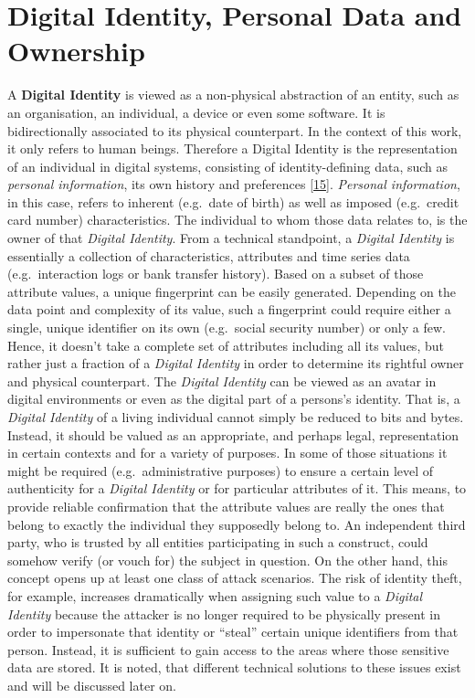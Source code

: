 \documentclass[12pt,english,a4paper,titlepage,cleardoublepage=empty,dottedtoc]{report}
\begin{document}
\hypertarget{digital-identity-personal-data-and-ownership}{\section{Digital
Identity, Personal Data and
Ownership}\label{digital-identity-personal-data-and-ownership}}

A \textbf{\protect\hypertarget{def--digital-identity}{}{Digital
Identity}} is viewed as a non-physical abstraction of an entity, such as
an organisation, an individual, a device or even some software. It is
bidirectionally associated to its physical counterpart. In the context
of this work, it only refers to human beings. Therefore a Digital
Identity is the representation of an individual in digital systems,
consisting of identity-defining data, such as \emph{personal
information}, its own history and preferences
{[}\protect\hyperlink{ref-whitepaper_2012_the-value-of-our-digital-identity_definition}{15}{]}.
\emph{Personal information}, in this case, refers to inherent (e.g.~date
of birth) as well as imposed (e.g.~credit card number) characteristics.
The individual to whom those data relates to, is the owner of that
\emph{Digital Identity}. From a technical standpoint, a \emph{Digital
Identity} is essentially a collection of characteristics, attributes and
time series data (e.g.~interaction logs or bank transfer history). Based
on a subset of those attribute values, a unique fingerprint can be
easily generated. Depending on the data point and complexity of its
value, such a fingerprint could require either a single, unique
identifier on its own (e.g.~social security number) or only a few.
Hence, it doesn't take a complete set of attributes including all its
values, but rather just a fraction of a \emph{Digital Identity} in order
to determine its rightful owner and physical counterpart. The
\emph{Digital Identity} can be viewed as an avatar in digital
environments or even as the digital part of a persons's identity. That
is, a \emph{Digital Identity} of a living individual cannot simply be
reduced to bits and bytes. Instead, it should be valued as an
appropriate, and perhaps legal, representation in certain contexts and
for a variety of purposes. In some of those situations it might be
required (e.g.~administrative purposes) to ensure a certain level of
authenticity for a \emph{Digital Identity} or for particular attributes
of it. This means, to provide reliable confirmation that the attribute
values are really the ones that belong to exactly the individual they
supposedly belong to. An independent third party, who is trusted by all
entities participating in such a construct, could somehow verify (or
vouch for) the subject in question. On the other hand, this concept
opens up at least one class of attack scenarios. The risk of identity
theft, for example, increases dramatically when assigning such value to
a \emph{Digital Identity} because the attacker is no longer required to
be physically present in order to impersonate that identity or ``steal''
certain unique identifiers from that person. Instead, it is sufficient
to gain access to the areas where those sensitive data are stored. It is
noted, that different technical solutions to these issues exist and will
be discussed later on.
\end{document}
